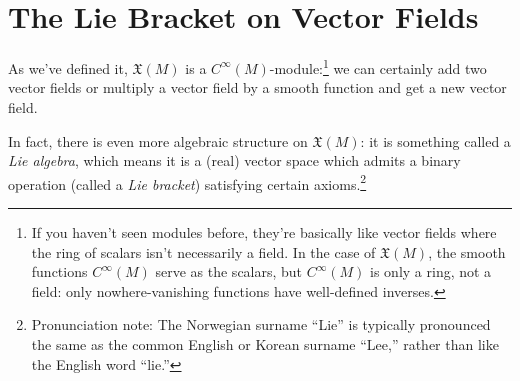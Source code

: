 
\section{The Lie Bracket on Vector Fields}

As we've defined it, $\mathfrak{X}(M)$ is a $C^\infty(M)$-module:\footnote{If you haven't seen modules before, they're basically like vector fields where the ring of scalars isn't necessarily a field. In the case of $\mathfrak{X}(M)$, the smooth functions $C^\infty(M)$ serve as the scalars, but $C^\infty(M)$ is only a ring, not a field: only nowhere-vanishing functions have well-defined inverses.}  we can certainly add two vector fields or multiply a vector field by a smooth function and get a new vector field.

In fact, there is even more algebraic structure on $\mathfrak{X}(M)$: it is something called a \emph{Lie algebra}, which means it is a (real) vector space which admits a binary operation (called a \emph{Lie bracket}) satisfying certain axioms.\footnote{Pronunciation note: The Norwegian surname ``Lie'' is typically pronounced the same as the common English or Korean surname ``Lee,'' rather than like the English word ``lie.''}

